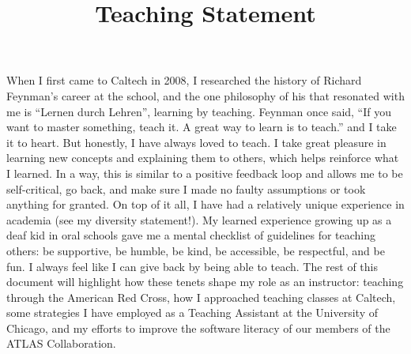 \documentclass[10pt,a4paper,sans]{moderncv} %
\title{Teaching Statement}
\begin{document}
\renewcommand*{\bibliographyhead}[1]{\section{#1}}
\makecvtitle %
\vspace*{-2em}

When I first came to Caltech in 2008, I researched the history of Richard Feynman's career at the school, and the one philosophy of his that resonated with me is ``Lernen durch Lehren'', learning by teaching. Feynman once said, ``If you want to master something, teach it. A great way to learn is to teach.'' and I take it to heart. But honestly, I have always loved to teach. I take great pleasure in learning new concepts and explaining them to others, which helps reinforce what I learned. In a way, this is similar to a positive feedback loop and allows me to be self-critical, go back, and make sure I made no faulty assumptions or took anything for granted. On top of it all, I have had a relatively unique experience in academia (see my diversity statement!). My learned experience growing up as a deaf kid in oral schools gave me a mental checklist of guidelines for teaching others: be supportive, be humble, be kind, be accessible, be respectful, and be fun. I always feel like I can give back by being able to teach. The rest of this document will highlight how these tenets shape my role as an instructor: teaching through the American Red Cross, how I approached teaching classes at Caltech, some strategies I have employed as a Teaching Assistant at the University of Chicago, and my efforts to improve the software literacy of our members of the ATLAS Collaboration.
\end{document}
